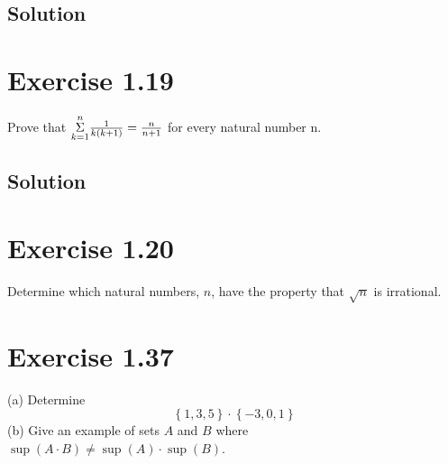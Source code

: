 \documentclass[12pt]{report}
\begin{document}
\subsection*{Solution}

\pagebreak
\section{Exercise 1.19}
Prove that $\overunderset{n}{k = 1}{\Sigma}\frac{1}{k(k + 1)} = \frac{n}{n + 1}$ for every natural number n. 

\subsection*{Solution}

\pagebreak
\section{Exercise 1.20}
Determine which natural numbers, $n$, have the  property that $\sqrt{n}$ is irrational. 

\pagebreak
\section{Exercise 1.37}
(a) Determine
\[ \left\{1,3,5\right\} \cdot \left\{-3,0,1\right\} \]
(b) Give an example of sets $A$ and $B$ where $\sup(A\cdot B) \ne \sup(A) \cdot \sup(B)$.
\end{document}
